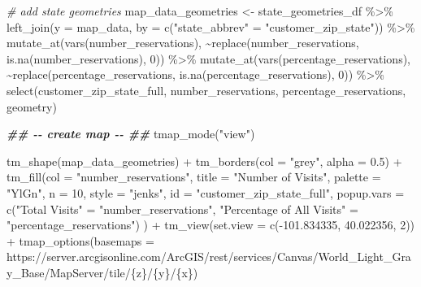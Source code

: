 \documentclass[
  11 pt,
  openany]{book}
\newenvironment{Shaded}{\begin{snugshade}}{\end{snugshade}}
\newcommand{\AttributeTok}[1]{\textcolor[rgb]{0.77,0.63,0.00}{#1}}
\newcommand{\CommentTok}[1]{\textcolor[rgb]{0.56,0.35,0.01}{\textit{#1}}}
\newcommand{\DecValTok}[1]{\textcolor[rgb]{0.00,0.00,0.81}{#1}}
\newcommand{\DocumentationTok}[1]{\textcolor[rgb]{0.56,0.35,0.01}{\textbf{\textit{#1}}}}
\newcommand{\FloatTok}[1]{\textcolor[rgb]{0.00,0.00,0.81}{#1}}
\newcommand{\FunctionTok}[1]{\textcolor[rgb]{0.00,0.00,0.00}{#1}}
\newcommand{\NormalTok}[1]{#1}
\newcommand{\OtherTok}[1]{\textcolor[rgb]{0.56,0.35,0.01}{#1}}
\newcommand{\SpecialCharTok}[1]{\textcolor[rgb]{0.00,0.00,0.00}{#1}}
\newcommand{\StringTok}[1]{\textcolor[rgb]{0.31,0.60,0.02}{#1}}
\begin{document}
\begin{Shaded}
\begin{Highlighting}[]
\CommentTok{\# add state geometries}
\NormalTok{map\_data\_geometries }\OtherTok{\textless{}{-}}
\NormalTok{  state\_geometries\_df }\SpecialCharTok{\%\textgreater{}\%}
  \FunctionTok{left\_join}\NormalTok{(}\AttributeTok{y =}\NormalTok{ map\_data,}
            \AttributeTok{by =} \FunctionTok{c}\NormalTok{(}\StringTok{"state\_abbrev"} \OtherTok{=} \StringTok{"customer\_zip\_state"}\NormalTok{)) }\SpecialCharTok{\%\textgreater{}\%}
  \FunctionTok{mutate\_at}\NormalTok{(}\FunctionTok{vars}\NormalTok{(number\_reservations), }
            \SpecialCharTok{\textasciitilde{}}\FunctionTok{replace}\NormalTok{(number\_reservations, }\FunctionTok{is.na}\NormalTok{(number\_reservations), }\DecValTok{0}\NormalTok{)) }\SpecialCharTok{\%\textgreater{}\%}
  \FunctionTok{mutate\_at}\NormalTok{(}\FunctionTok{vars}\NormalTok{(percentage\_reservations), }
            \SpecialCharTok{\textasciitilde{}}\FunctionTok{replace}\NormalTok{(percentage\_reservations, }\FunctionTok{is.na}\NormalTok{(percentage\_reservations), }
                     \DecValTok{0}\NormalTok{)) }\SpecialCharTok{\%\textgreater{}\%} 
  \FunctionTok{select}\NormalTok{(customer\_zip\_state\_full, number\_reservations, }
\NormalTok{         percentage\_reservations, geometry)}

\DocumentationTok{\#\# {-}{-} create map {-}{-} \#\#}
\FunctionTok{tmap\_mode}\NormalTok{(}\StringTok{"view"}\NormalTok{)}

\FunctionTok{tm\_shape}\NormalTok{(map\_data\_geometries) }\SpecialCharTok{+}
  \FunctionTok{tm\_borders}\NormalTok{(}\AttributeTok{col =} \StringTok{"grey"}\NormalTok{, }\AttributeTok{alpha =} \FloatTok{0.5}\NormalTok{) }\SpecialCharTok{+}
  \FunctionTok{tm\_fill}\NormalTok{(}\AttributeTok{col =} \StringTok{"number\_reservations"}\NormalTok{,}
          \AttributeTok{title =} \StringTok{"Number of Visits"}\NormalTok{,}
          \AttributeTok{palette =} \StringTok{"YlGn"}\NormalTok{,}
          \AttributeTok{n =} \DecValTok{10}\NormalTok{,}
          \AttributeTok{style =} \StringTok{"jenks"}\NormalTok{,}
          \AttributeTok{id =} \StringTok{"customer\_zip\_state\_full"}\NormalTok{,}
          \AttributeTok{popup.vars =} \FunctionTok{c}\NormalTok{(}\StringTok{"Total Visits"} \OtherTok{=} \StringTok{"number\_reservations"}\NormalTok{,}
                         \StringTok{"Percentage of All Visits"} \OtherTok{=} \StringTok{"percentage\_reservations"}\NormalTok{)}
\NormalTok{          ) }\SpecialCharTok{+}
  \FunctionTok{tm\_view}\NormalTok{(}\AttributeTok{set.view =} \FunctionTok{c}\NormalTok{(}\SpecialCharTok{{-}}\FloatTok{101.834335}\NormalTok{, }\FloatTok{40.022356}\NormalTok{, }\DecValTok{2}\NormalTok{)) }\SpecialCharTok{+}
  \FunctionTok{tmap\_options}\NormalTok{(}\AttributeTok{basemaps =} \StringTok{\textquotesingle{}https://server.arcgisonline.com/ArcGIS/rest/services/Canvas/World\_Light\_Gray\_Base/MapServer/tile/\{z\}/\{y\}/\{x\}\textquotesingle{}}\NormalTok{)}
\end{Highlighting}
\end{Shaded}
\end{document}
